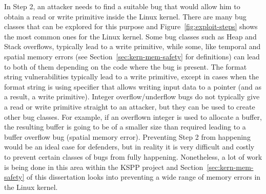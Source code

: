 In Step 2, an attacker needs to find a suitable bug that would allow him to obtain a read or write primitive inside the Linux kernel. There are many bug classes that can be explored for this purpose and Figure~\ref{fig:exploit-steps} shows the most common ones for the Linux kernel. Some bug classes such as Heap and Stack overflows, typically lead to a write primitive, while some, like temporal and spatial memory errors (see Section~\ref{sec:kern-mem-safety} for definitions) can lead to both of them depending on the code where the bug is present. The format string vulnerabilities typically lead to a write primitive, except in cases when the format string is using  specifier that allows writing input data to a pointer (and as a result, a write primitive). Integer overflow/underflow bugs do not typically give a read or write primitive straight to an attacker, but they can be used to create other bug classes. For example, if an overflown integer is used to allocate a buffer, the resulting buffer is going to be of a smaller size than required leading to a buffer overflow bug (spatial memory error). Preventing Step 2 from happening would be an ideal case for defenders, but in reality it is very difficult and costly to prevent certain classes of bugs from fully happening. Nonetheless, a lot of work is being done in this area within the KSPP project and Section~\ref{sec:kern-mem-safety} of this dissertation looks into preventing a wide range of memory errors in the Linux kernel. 

